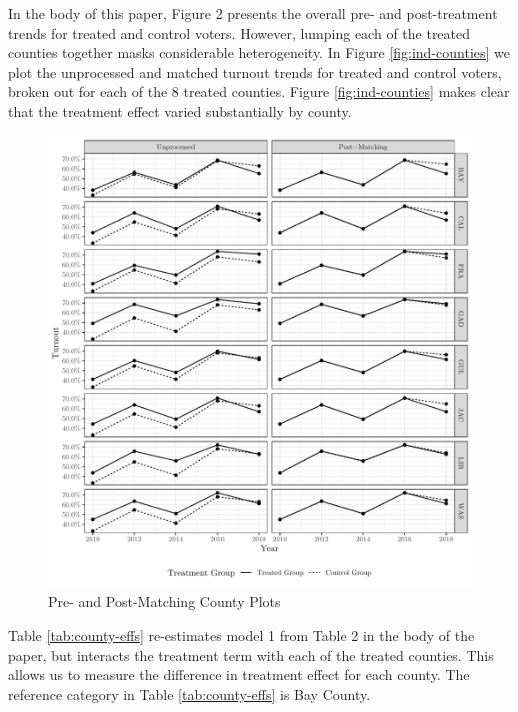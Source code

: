 \documentclass[
  12pt,
]{article}
\begin{document}
In the body of this paper, Figure 2 presents the overall pre- and post-treatment trends for treated and control voters. However, lumping each of the treated counties together masks considerable heterogeneity. In Figure \ref{fig:ind-counties} we plot the unprocessed and matched turnout trends for treated and control voters, broken out for each of the 8 treated counties. Figure \ref{fig:ind-counties} makes clear that the treatment effect varied substantially by county.

\begin{figure}[H]

{\centering \includegraphics{si_files/figure-latex/indcs-chunk-1} 

}

\caption{\label{fig:ind-counties}Pre- and Post-Matching County Plots}\label{fig:indcs-chunk}
\end{figure}

Table \ref{tab:county-effs} re-estimates model 1 from Table 2 in the body of the paper, but interacts the treatment term with each of the treated counties. This allows us to measure the difference in treatment effect for each county. The reference category in Table \ref{tab:county-effs} is Bay County.

\begin{singlespace}

\end{singlespace}
\end{document}
